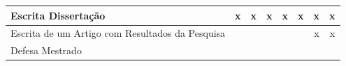 \documentclass[dm,ppgcomp]{texfurg} %
\begin{document}
\begin{table}[ht]
\begin{tabular}{|l|c|c|c|c|c|c|c|}
Escrita Dissertação                             & x                        & x                        & x                        & x                        & x                        & x                        & x                        \\ \hline
Escrita de um Artigo com Resultados da Pesquisa &                          &                          &                          &                          &                          & x                        & x                        \\ \hline
Defesa Mestrado                                 &                          &                          &                          &                          &                          &                          &                          \\ \hline
\end{tabular}
\end{table}







\end{document}
